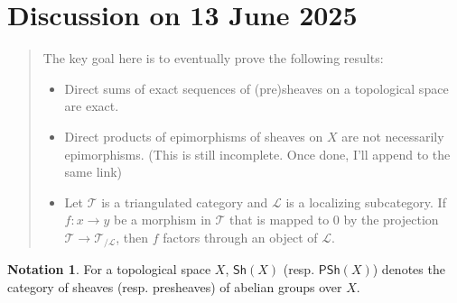 \documentclass[oneside,11pt]{amsart}
\theoremstyle{definition}
\newtheorem{notn}[thm]{Notation}
\theoremstyle{remark}
\begin{document}
\section*{Discussion on 13 June 2025} 
\begin{quotation}
 The key goal here is to eventually prove the following results:
 \begin{itemize}
  \item Direct sums of exact sequences of (pre)sheaves on a topological space are exact.
 \item Direct products of epimorphisms of sheaves on $X$ are not necessarily epimorphisms. (This is still incomplete. Once done, I'll append to the same link)
 \item Let $\mathscr{T} $ is a triangulated category and $\mathscr{L} $ is a localizing subcategory. If $f:x\rightarrow y$ be a morphism in $\mathscr{T} $ that is mapped to $0$ by the projection $\mathscr{T} \rightarrow \mathscr{T}_{/\mathscr{L}}   $, then $f$ factors through an object of $\mathscr{L} $.  
 \end{itemize}
\end{quotation}
\begin{notn}
For a topological space $X$, $\textsf{Sh}(X)$ (resp. $\textsf{PSh}(X)$) denotes the category of sheaves (resp. presheaves) of abelian groups over $X$.      
\end{notn}
\end{document}
